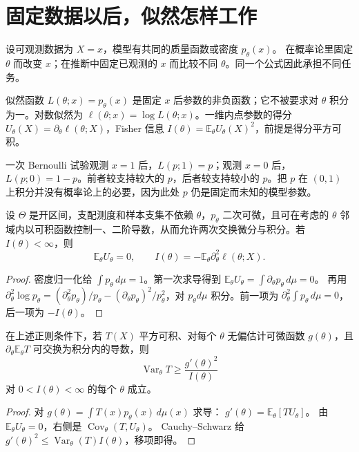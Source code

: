\section{固定数据以后，似然怎样工作}

设可观测数据为 \(X=x\)，模型有共同的质量函数或密度 \(p_\theta(x)\)。
在概率论里固定 \(\theta\) 而改变 \(x\)；在推断中固定已观测的 \(x\) 而比较不同 \(\theta\)。同一个公式因此承担不同任务。

\begin{definition}[似然、得分与信息]
似然函数 \(L(\theta;x)=p_\theta(x)\) 是固定 \(x\) 后参数的非负函数；它不被要求对 \(\theta\) 积分为一。对数似然为 \(\ell(\theta;x)=\log L(\theta;x)\)。一维内点参数的得分 \(U_\theta(X)=\partial_\theta\ell(\theta;X)\)，Fisher 信息
\(I(\theta)=\mathbb E_\theta U_\theta(X)^2\)，前提是得分平方可积。
\end{definition}

一次 Bernoulli 试验观测 \(x=1\) 后，\(L(p;1)=p\)；观测 \(x=0\) 后，\(L(p;0)=1-p\)。前者较支持较大的 \(p\)，后者较支持较小的 \(p\)。把 \(p\) 在 \((0,1)\) 上积分并没有概率论上的必要，因为此处 \(p\) 仍是固定而未知的模型参数。

\begin{proposition}[信息恒等式]
设 \(\Theta\) 是开区间，支配测度和样本支集不依赖 \(\theta\)，\(p_\theta\) 二次可微，且可在考虑的 \(\theta\) 邻域内以可积函数控制一、二阶导数，从而允许两次交换微分与积分。若 \(I(\theta)<\infty\)，则
\[
\mathbb E_\theta U_\theta=0,\qquad
I(\theta)=-\mathbb E_\theta\partial_\theta^2\ell(\theta;X).
\]
\end{proposition}
\begin{proof}
密度归一化给 \(\int p_\theta\,d\mu=1\)。第一次求导得到
\(\mathbb E_\theta U_\theta=\int\partial_\theta p_\theta\,d\mu=0\)。
再用
\(\partial_\theta^2\log p_\theta
=(\partial_\theta^2p_\theta)/p_\theta-
(\partial_\theta p_\theta)^2/p_\theta^2\)，对 \(p_\theta d\mu\) 积分。前一项为 \(\partial_\theta^2\int p_\theta\,d\mu=0\)，后一项为 \(-I(\theta)\)。
\end{proof}

\begin{theorem}
在上述正则条件下，若 \(T(X)\) 平方可积、对每个 \(\theta\) 无偏估计可微函数 \(g(\theta)\)，且 \(\partial_\theta \mathbb E_\theta T\) 可交换为积分内的导数，则
\[
\operatorname{Var}_\theta T\ge \frac{g'(\theta)^2}{I(\theta)}
\]
对 \(0<I(\theta)<\infty\) 的每个 \(\theta\) 成立。
\end{theorem}
\begin{proof}
对 \(g(\theta)=\int T(x)p_\theta(x)\,d\mu(x)\) 求导：
\(g'(\theta)=\mathbb E_\theta[TU_\theta]\)。
由 \(\mathbb E_\theta U_\theta=0\)，右侧是
\(\operatorname{Cov}_\theta(T,U_\theta)\)。
Cauchy--Schwarz 给
\(g'(\theta)^2\le\operatorname{Var}_\theta(T)I(\theta)\)，移项即得。
\end{proof}

